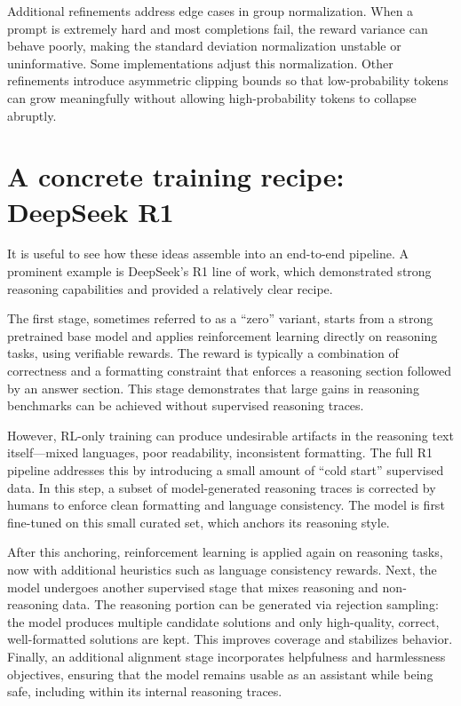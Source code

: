 Additional refinements address edge cases in group normalization. When a prompt is extremely hard and most completions fail, the reward variance can behave poorly, making the standard deviation normalization unstable or uninformative. Some implementations adjust this normalization. Other refinements introduce asymmetric clipping bounds so that low-probability tokens can grow meaningfully without allowing high-probability tokens to collapse abruptly.

\section{A concrete training recipe: DeepSeek R1}
It is useful to see how these ideas assemble into an end-to-end pipeline. A prominent example is DeepSeek’s R1 line of work, which demonstrated strong reasoning capabilities and provided a relatively clear recipe.

The first stage, sometimes referred to as a “zero” variant, starts from a strong pretrained base model and applies reinforcement learning directly on reasoning tasks, using verifiable rewards. The reward is typically a combination of correctness and a formatting constraint that enforces a reasoning section followed by an answer section. This stage demonstrates that large gains in reasoning benchmarks can be achieved without supervised reasoning traces.

However, RL-only training can produce undesirable artifacts in the reasoning text itself—mixed languages, poor readability, inconsistent formatting. The full R1 pipeline addresses this by introducing a small amount of “cold start” supervised data. In this step, a subset of model-generated reasoning traces is corrected by humans to enforce clean formatting and language consistency. The model is first fine-tuned on this small curated set, which anchors its reasoning style.

After this anchoring, reinforcement learning is applied again on reasoning tasks, now with additional heuristics such as language consistency rewards. Next, the model undergoes another supervised stage that mixes reasoning and non-reasoning data. The reasoning portion can be generated via rejection sampling: the model produces multiple candidate solutions and only high-quality, correct, well-formatted solutions are kept. This improves coverage and stabilizes behavior. Finally, an additional alignment stage incorporates helpfulness and harmlessness objectives, ensuring that the model remains usable as an assistant while being safe, including within its internal reasoning traces.

